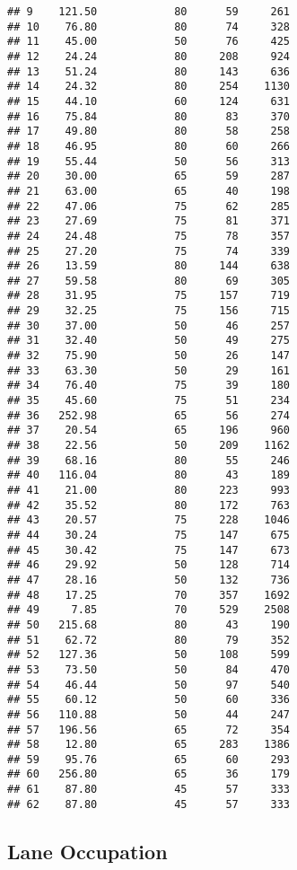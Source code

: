 \documentclass[
]{article}
\begin{document}
\begin{verbatim}
## 9    121.50            80      59     261
## 10    76.80            80      74     328
## 11    45.00            50      76     425
## 12    24.24            80     208     924
## 13    51.24            80     143     636
## 14    24.32            80     254    1130
## 15    44.10            60     124     631
## 16    75.84            80      83     370
## 17    49.80            80      58     258
## 18    46.95            80      60     266
## 19    55.44            50      56     313
## 20    30.00            65      59     287
## 21    63.00            65      40     198
## 22    47.06            75      62     285
## 23    27.69            75      81     371
## 24    24.48            75      78     357
## 25    27.20            75      74     339
## 26    13.59            80     144     638
## 27    59.58            80      69     305
## 28    31.95            75     157     719
## 29    32.25            75     156     715
## 30    37.00            50      46     257
## 31    32.40            50      49     275
## 32    75.90            50      26     147
## 33    63.30            50      29     161
## 34    76.40            75      39     180
## 35    45.60            75      51     234
## 36   252.98            65      56     274
## 37    20.54            65     196     960
## 38    22.56            50     209    1162
## 39    68.16            80      55     246
## 40   116.04            80      43     189
## 41    21.00            80     223     993
## 42    35.52            80     172     763
## 43    20.57            75     228    1046
## 44    30.24            75     147     675
## 45    30.42            75     147     673
## 46    29.92            50     128     714
## 47    28.16            50     132     736
## 48    17.25            70     357    1692
## 49     7.85            70     529    2508
## 50   215.68            80      43     190
## 51    62.72            80      79     352
## 52   127.36            50     108     599
## 53    73.50            50      84     470
## 54    46.44            50      97     540
## 55    60.12            50      60     336
## 56   110.88            50      44     247
## 57   196.56            65      72     354
## 58    12.80            65     283    1386
## 59    95.76            65      60     293
## 60   256.80            65      36     179
## 61    87.80            45      57     333
## 62    87.80            45      57     333
\end{verbatim}

\hypertarget{lane-occupation}{%
\subsection{Lane Occupation}\label{lane-occupation}}
\end{document}
